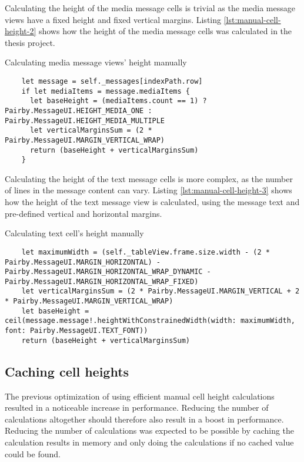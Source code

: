 \documentclass[a4paper,12pt]{article}
\begin{document}
Calculating the height of the media message cells is trivial as the media message views have a fixed height and fixed vertical margins. Listing \autoref{lst:manual-cell-height-2} shows how the height of the media message cells was calculated in the thesis project.
\begin{listing}[H]
  \caption{Calculating media message views' height manually}
  \label{lst:manual-cell-height-2}
  \begin{verbatim}
    let message = self._messages[indexPath.row]
    if let mediaItems = message.mediaItems {
      let baseHeight = (mediaItems.count == 1) ? Pairby.MessageUI.HEIGHT_MEDIA_ONE : Pairby.MessageUI.HEIGHT_MEDIA_MULTIPLE
      let verticalMarginsSum = (2 * Pairby.MessageUI.MARGIN_VERTICAL_WRAP)
      return (baseHeight + verticalMarginsSum)
    }
  \end{verbatim}
\end{listing}

Calculating the height of the text message cells is more complex, as the number of lines in the message content can vary. Listing \autoref{lst:manual-cell-height-3} shows how the height of the text message view is calculated, using the message text and pre-defined vertical and horizontal margins.
\begin{listing}[H]
  \caption{Calculating text cell's height manually}
  \label{lst:manual-cell-height-3}
  \begin{verbatim}
    let maximumWidth = (self._tableView.frame.size.width - (2 * Pairby.MessageUI.MARGIN_HORIZONTAL) - Pairby.MessageUI.MARGIN_HORIZONTAL_WRAP_DYNAMIC - Pairby.MessageUI.MARGIN_HORIZONTAL_WRAP_FIXED)
    let verticalMarginsSum = (2 * Pairby.MessageUI.MARGIN_VERTICAL + 2 * Pairby.MessageUI.MARGIN_VERTICAL_WRAP)
    let baseHeight = ceil(message.message!.heightWithConstrainedWidth(width: maximumWidth, font: Pairby.MessageUI.TEXT_FONT))
    return (baseHeight + verticalMarginsSum)
  \end{verbatim}
\end{listing}

\subsection{Caching cell heights}
\label{subsec:caching-cell-heights}
The previous optimization of using efficient manual cell height calculations resulted in a noticeable increase in performance. Reducing the number of calculations altogether should therefore also result in a boost in performance. Reducing the number of calculations was expected to be possible by caching the calculation results in memory and only doing the calculations if no cached value could be found.
\end{document}
